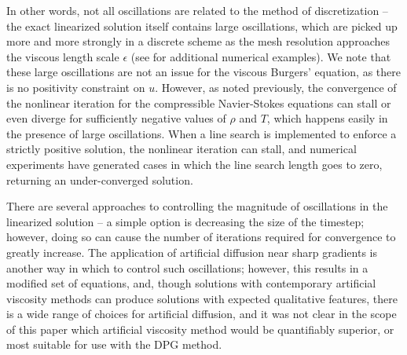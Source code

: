 In other words, not all oscillations are related to the method of discretization -- the exact linearized solution itself contains large oscillations, which are picked up more and more strongly in a discrete scheme as the mesh resolution approaches the viscous length scale $\epsilon$ (see \cite{DPGspacetime, DPGNS_1d} for additional numerical examples).  We note that these large oscillations are not an issue for the viscous Burgers' equation, as there is no positivity constraint on $u$.  However, as noted previously, the convergence of the nonlinear iteration for the compressible Navier-Stokes equations can stall or even diverge for sufficiently negative values of $\rho$ and $T$, which happens easily in the presence of large oscillations.  When a line search is implemented to enforce a strictly positive solution, the nonlinear iteration can stall, and numerical experiments have generated cases in which the line search length goes to zero, returning an under-converged solution.  

There are several approaches to controlling the magnitude of oscillations in the linearized solution -- a simple option is decreasing the size of the timestep; however, doing so can cause the number of iterations required for convergence to greatly increase.  The application of artificial diffusion near sharp gradients is another way in which to control such oscillations; however, this results in a modified set of equations, and, though solutions with contemporary artificial viscosity methods can produce solutions with expected qualitative features, there is a wide range of choices for artificial diffusion, and it was not clear in the scope of this paper which artificial viscosity method would be quantifiably superior, or most suitable for use with the DPG method.  

